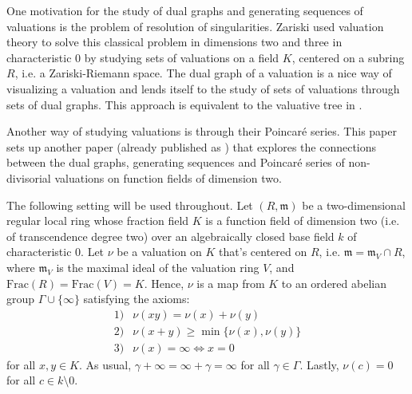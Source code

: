 \documentclass[11pt]{amsart}
\theoremstyle{definition}
\begin{document}
One motivation for the study of dual graphs and generating sequences of valuations is the problem of resolution of singularities. Zariski used valuation theory to solve this classical problem in dimensions two and three in characteristic 0 by studying sets of valuations on a field $K$, centered on a subring $R$, i.e. a Zariski-Riemann space. The dual graph of a valuation is a nice way of visualizing a valuation and lends itself to the study of sets of valuations through sets of dual graphs. This approach is equivalent to the valuative tree in \cite{fj}.

Another way of studying valuations is through their Poincar\'e series. This paper sets up another paper (already published as \cite{lisch}) that explores the connections between the dual graphs, generating sequences and Poincar\'e series of non-divisorial valuations on function fields of dimension two.

The following setting will be used throughout. Let $(R,\mathfrak{m})$ be a two-dimensional regular local ring whose fraction field $K$ is a function field of dimension two (i.e. of transcendence degree two) over an algebraically closed base field $k$ of characteristic 0. Let $\nu$ be a valuation on $K$ that's centered on $R$, i.e. $\mathfrak{m}=\mathfrak{m}_{V}\cap R$, where $\mathfrak{m}_V$ is the maximal ideal of the valuation ring $V$, and $\text{Frac}(R)=\text{Frac}(V)=K$. Hence, $\nu$ is a map from $K$ to an ordered abelian group $\Gamma \cup \{\infty\}$  satisfying the axioms:
\begin{equation*}
\begin{array}{ll}
1) & \nu(xy)=\nu(x)+\nu(y) \\
2) & \nu(x+y)\geq \min\{\nu(x),\nu(y)\}\\
3) & \nu(x)=\infty \iff x=0
\end{array}
\end{equation*}
for all $x,y\in K$. As usual, $\gamma+\infty=\infty+\gamma=\infty$ for all $\gamma\in\Gamma$. Lastly, $\nu(c)=0$ for all $c\in k\setminus{0}$.
\end{document}
